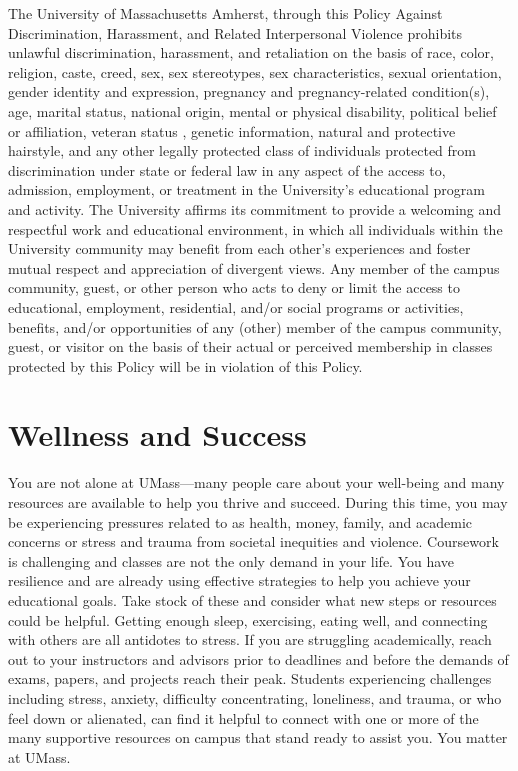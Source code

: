 \documentclass[11pt,twoside]{article}
\numberwithin{equation}{section}
\newcommand{\?}{\stackrel{?}{=}}
\begin{document}
The University of Massachusetts Amherst, through this Policy Against Discrimination, Harassment, and Related Interpersonal Violence prohibits unlawful discrimination, harassment, and retaliation on the basis of race, color, religion, caste, creed, sex, sex stereotypes, sex characteristics, sexual orientation, gender identity and expression, pregnancy and pregnancy-related condition(s), age, marital status, national origin, mental or physical disability, political belief or affiliation, veteran status , genetic information, natural and protective hairstyle, and any other legally protected class of individuals protected from discrimination under state or federal law in any aspect of the access to, admission, employment, or treatment in the University's educational program and activity. The University affirms its commitment to provide a welcoming and respectful work and educational environment, in which all individuals within the University community may benefit from each other's experiences and foster mutual respect and appreciation of divergent views. Any member of the campus community, guest, or other person who acts to deny or limit the access to educational, employment, residential, and/or social programs or activities, benefits, and/or opportunities of any (other) member of the campus community, guest, or visitor on the basis of their actual or perceived membership in classes protected by this Policy will be in violation of this Policy.



\section{Wellness and Success}
You are not alone at UMass---many people care about your well-being and many resources are available to help you thrive and succeed.
During this time, you may be experiencing pressures related to as health, money, family, and academic concerns or stress and trauma from societal inequities and violence.
Coursework is challenging and classes are not the only demand in your life. 
You have resilience and are already using effective strategies to help you achieve your educational goals.
Take stock of these and consider what new steps or resources could be helpful.
Getting enough sleep, exercising, eating well, and connecting with others are all antidotes to stress.
If you are struggling academically, reach out to your instructors and advisors prior to deadlines and before the demands of exams, papers, and projects reach their peak. 
Students experiencing challenges including stress, anxiety, difficulty concentrating, loneliness, and trauma, or who feel down or alienated, can find it helpful to connect with one or more of the many supportive resources on campus that stand ready to assist you. You matter at UMass. 
\end{document}
